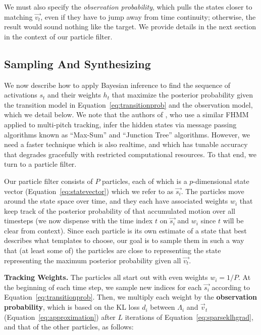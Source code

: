 \documentclass{article}
\begin{document}
    We must also specify the {\em observation probability}, which pulls the states closer to matching $\vec{v_t}$, even if they have to jump away from time continuity; otherwise, the result would sound nothing like the target. We provide details in the next section in the context of our particle filter.



\subsection{Sampling  And Synthesizing}
\label{sec:sampling}

We now describe how to apply Bayesian inference to find the sequence of activations $s_t$ and their weights $h_t$ that maximize the posterior probability given the transition model in Equation~\ref{eq:transitionprob} and the observation model, which we detail below.  We note that the authors of \cite{wohlmayr2010probabilistic}, who use a similar FHMM applied to multi-pitch tracking, infer the hidden states via message passing algorithms known as ``Max-Sum'' \cite{kschischang2001factor} and ``Junction Tree'' \cite{jensen1996introduction} algorithms.  However, we need a faster technique which is also realtime, and which has tunable accuracy that degrades gracefully with restricted computational resources.  To that end, we turn to a particle filter.

Our particle filter consists of $P$ particles, each of which is a $p$-dimensional state vector (Equation~\ref{eq:statevector}) which we refer to as $\vec{s_i}$.  The particles move around the state space over time, and they each have associated weights $w_i$ that keep track of the posterior probability of that accumulated motion over all timesteps (we now dispense with the time index $t$ on $\vec{s_i}$ and $w_i$ since $t$ will be clear from context).  Since each particle is its own estimate of a state that best describes what templates to choose, our goal is to sample them in such a way that (at least some of) the particles are close to representing the state representing the maximum posterior probability given all $\vec{v_t}$.

\textbf{Tracking Weights.} The particles all start out with even weights $w_i = 1/P$.  At the beginning of each time step, we sample new indices for each $\vec{s_i}$ according to Equation~\ref{eq:transitionprob}.  Then, we multiply each weight by the \textbf{observation probability}, which is based on the KL loss $d_i$ between $\Lambda_i$ and $\vec{v}_t$ (Equation~\ref{eq:approximation}) after $L$ iterations of Equation~\ref{eq:sparseklhgrad}, and that of the other particles, as follows:
\end{document}

